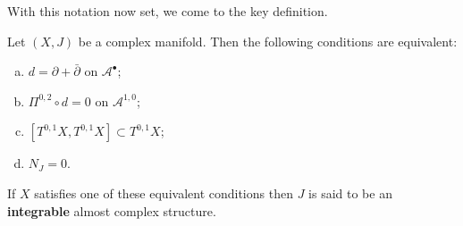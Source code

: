 \documentclass{amsart}
\begin{document}
With this notation now set, we come to the key definition.
\begin{proposition}
    Let $(X,J)$ be a complex manifold. Then the following conditions are equivalent:
    \begin{enumerate}[(a)]
        \item $d=\partial+\bar\partial$ on $\mathcal{A}^\bullet$;
        \item $\Pi^{0,2}\circ d=0$ on $\mathcal{A}^{1,0}$;
        \item $[T^{0,1}X,T^{0,1}X]\subset T^{0,1}X$;
        \item $N_J=0$.
    \end{enumerate}
    If $X$ satisfies one of these equivalent conditions then $J$ is said to be an
    \textbf{integrable} almost complex structure.
    \label{prop:integrable}
\end{proposition}
\end{document}
